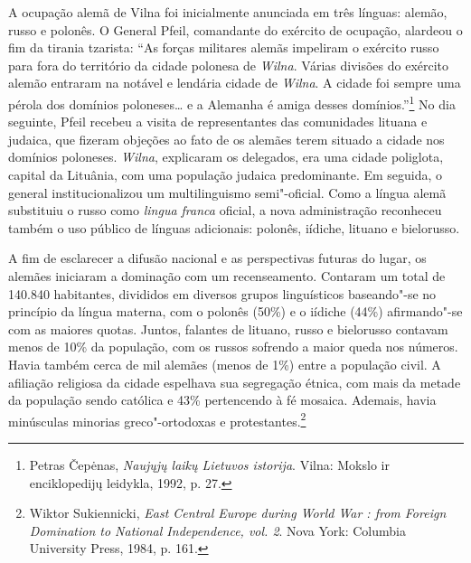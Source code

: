A ocupação alemã de Vilna foi inicialmente anunciada em três línguas:
alemão, russo e polonês. O General Pfeil, comandante do exército de
ocupação, alardeou o fim da tirania tzarista: ``As forças militares
alemãs impeliram o exército russo para fora do território da cidade
polonesa de \textit{Wilna}. Várias divisões do exército alemão entraram na
notável e lendária cidade de \textit{Wilna}. A cidade foi sempre uma pérola dos
domínios poloneses\ldots{} e a Alemanha é amiga desses
domínios.''\footnote{Petras Čepėnas, \textit{Naujųjų laikų Lietuvos istorija}. Vilna: Mokslo ir enciklopedijų leidykla, 1992, p. 27.} No dia seguinte, Pfeil recebeu a visita de representantes das comunidades lituana e judaica, que fizeram objeções ao fato de os
alemães terem situado a cidade nos domínios poloneses. \textit{Wilna}, explicaram
os delegados, era uma cidade poliglota, capital da Lituânia, com uma
população judaica predominante. Em seguida, o general institucionalizou
um multilinguismo semi"-oficial. Como a língua alemã substituiu o russo
como \textit{lingua franca} oficial, a nova administração reconheceu
também o uso público de línguas adicionais: polonês, iídiche, lituano e
bielorusso.

A fim de esclarecer a difusão nacional e as perspectivas futuras do
lugar, os alemães iniciaram a dominação com um recenseamento. Contaram
um total de 140.840 habitantes, divididos em diversos grupos
linguísticos baseando"-se no princípio da língua materna, com o polonês
(50\%) e o iídiche (44\%) afirmando"-se com as maiores quotas. Juntos,
falantes de lituano, russo e bielorusso contavam menos de 10\% da
população, com os russos sofrendo a maior queda nos números. Havia
também cerca de mil alemães (menos de 1\%) entre a população civil. A
afiliação religiosa da cidade espelhava sua segregação étnica, com mais
da metade da população sendo católica e 43\% pertencendo à fé mosaica.
Ademais, havia minúsculas minorias greco"-ortodoxas e
protestantes.\footnote{Wiktor Sukiennicki, \textit{East Central Europe during World War : from Foreign Domination to National Independence, vol. 2}. Nova York: Columbia University Press, 1984, p. 161.}

